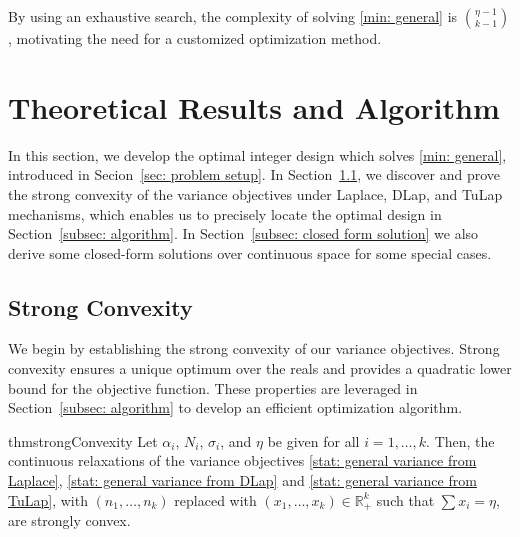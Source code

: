 \documentclass{article}
\theoremstyle{definition}
\begin{document}
By using an exhaustive search, the complexity of solving \eqref{min: general} is $\binom{\eta-1}{k-1}$ \citep{Ross1974}, motivating the need for a customized optimization method.

\section{Theoretical Results and Algorithm} \label{sec: theory and alg.}

In this section, we develop the optimal integer design which solves \eqref{min: general}, introduced in Secion~\ref{sec: problem setup}. In Section~\ref{sec: strong convexity}, we discover and prove the strong convexity of the variance objectives under Laplace, DLap, and TuLap mechanisms, which enables us to precisely locate the optimal design in Section~\ref{subsec: algorithm}. In Section~\ref{subsec: closed form solution} we also derive some closed-form solutions over continuous space for some special cases.

\subsection{Strong Convexity} \label{sec: strong convexity}

We begin by establishing the strong convexity of our variance objectives. Strong convexity ensures a unique optimum over the reals and provides a quadratic lower bound for the objective function. These properties are leveraged in Section~\ref{subsec: algorithm} to develop an efficient optimization algorithm.

\begin{restatable}{thm}{strongConvexity} \label{thm: strong convexity}
Let $\alpha_i$, $N_i$, $\sigma_i$, and $\eta$ be given for all $i=1,\ldots, k$. 
        Then, the continuous relaxations of the variance objectives \eqref{stat: general variance from Laplace}, \eqref{stat: general variance from DLap} and \eqref{stat: general variance from TuLap}, with $(n_1,\ldots,n_k)$ replaced with $(x_1,\ldots,x_k) \in \mathbb{R}^k_+$ such that $\sum x_i = \eta$, are strongly convex.
\end{restatable}
\end{document}
